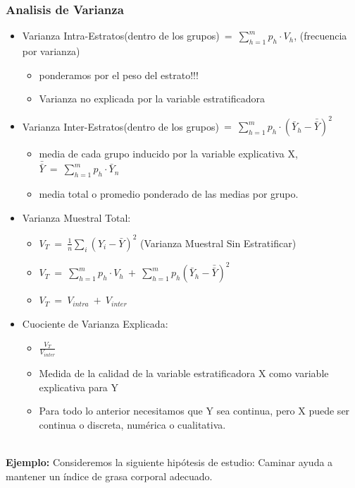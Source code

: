 \subsubsection{Analisis de Varianza}
	\begin{itemize}
		\item Varianza Intra-Estratos(dentro de los grupos)$\ =\ \sum_{h=1}^{m}p_{h}\cdot V_{h}$, (frecuencia por varianza)
		\begin{itemize}
			\item ponderamos por el peso del estrato!!!
			\item Varianza no explicada por la variable estratificadora
		\end{itemize}
		\item Varianza Inter-Estratos(dentro de los grupos)$\ =\ \sum_{h=1}^{m}p_{h}\cdot(\bar{Y}_{h}-\bar{\bar{Y}})^{2}$
		\begin{itemize}
			\item media de cada grupo inducido por la variable explicativa X, $\bar{\bar{Y}}\ =\ \sum_{h=1}^{m}p_{h}\cdot\bar{Y}_{n}$
			\item media total o promedio ponderado de las medias por grupo.
		\end{itemize}
		\item Varianza Muestral Total:
		\begin{itemize}
			\item $V_{T}\ =\ \frac{1}{n}\sum_{i}(Y_{i}-\bar{Y})^2$ (Varianza Muestral Sin Estratificar)
			\item $V_{T}\ =\ \sum_{h=1}^{m}p_{h}\cdot V_{h}\ +\ \sum_{h=1}^{m}p_h(\bar{Y}_{h}-\bar{\bar{Y}})^{2}$
			\item $V_{T}\ =\ V_{intra}\ +\ V_{inter}$
		\end{itemize}
		\item Cuociente de Varianza Explicada:
		\begin{itemize}
			\item $\frac{V_{T}}{V_{inter}}$
			\item Medida de la calidad de la variable estratificadora X como variable explicativa para Y\\
			\item Para todo lo anterior necesitamos que Y sea continua, pero X puede ser continua o discreta, numérica o cualitativa.\\\\
		\end{itemize}
	\end{itemize}
	\textbf{Ejemplo:}
	Consideremos la siguiente hip\'otesis de estudio: Caminar ayuda a mantener un \'indice de grasa corporal adecuado.\\
